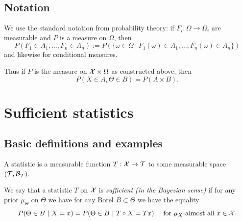 \documentclass[twoside, a4paper, 10pt]{amsart}
\begin{document}
\subsection{Notation} We use the standard notation from probability theory: if $F_i:\Omega \to \Omega_i$ are measurable and $P$ is a measure on $\Omega$, then $$P(F_1 \in A_1, \ldots, F_n \in A_n) := P(\{\omega \in \Omega ~|~  F_1(\omega) \in A_1, \ldots, F_n(\omega) \in A_n \})$$ and likewise for conditional measures.

Thus if $P$ is the measure on $\mathcal{X} \times \Omega$ as constructed above, then $$P(X \in A, \Theta \in B) = P(A \times B).$$ 

\section{Sufficient statistics}

\subsection{Basic definitions and examples}

A statistic is a measurable function $T:\mathcal{X} \to \mathcal{T}$ to some measurable space $(\mathcal{T}, \mathcal{B}_{\mathcal{T}})$.  

\begin{mydef} We say that a statistic $T$ on $\mathcal{X}$ is \textit{sufficient (in the Bayesian sense)} if for any prior $\mu_{\Theta}$ on $\Theta$ we have for any Borel $B \subset \Theta$ we have the equality $$P(\Theta \in B ~|~ X = x) = P(\Theta \in B ~|~ T \circ X = Tx) \quad \text{ for } \mu_X\text{-almost all } x \in \mathcal{X}.$$

\end{mydef}
\end{document}
